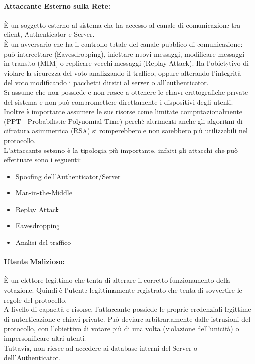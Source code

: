 		\paragraph{Attaccante Esterno sulla Rete:}
		È un soggetto esterno al sistema che ha accesso al canale di comunicazione tra client, Authenticator e Server.\\
		È un avversario che ha il controllo totale del canale pubblico di comunicazione: può intercettare (Eavesdropping), iniettare nuovi messaggi, modificare messaggi in transito (MIM) o replicare vecchi messaggi (Replay Attack). Ha l'obietytivo di violare la sicurezza del voto analizzando il traffico, oppure alterando l'integrità del voto modificando i pacchetti diretti al server o all'authenticator.\\
		Si assume che non possiede e non riesce a ottenere le chiavi crittografiche private del sistema e non può compromettere direttamente i dispositivi degli utenti. Inoltre è importante assumere le sue risorse come limitate computazionalmente (PPT - Probabilistic Polynomial Time) perchè altrimenti anche gli algoritmi di cifratura asimmetrica (RSA) si romperebbero e non sarebbero più utilizzabili nel protocollo.\\
		L'attaccante esterno è la tipologia più importante, infatti gli attacchi che può effettuare sono i seguenti:
		\begin{itemize}
			\item Spoofing dell'Authenticator/Server
			\item Man-in-the-Middle
			\item Replay Attack
			\item Eavesdropping
			\item Analisi del traffico
		\end{itemize}
		
		\paragraph{Utente Malizioso:}
		È un elettore legittimo che tenta di alterare il corretto funzionamento della votazione. Quindi è l'utente legittimamente registrato che tenta di sovvertire le regole del protocollo.\\
		A livello di capacità e risorse, l'attaccante possiede le proprie credenziali legittime di autenticazione e chiavi private. Può deviare arbitrariamente dalle istruzioni del protocollo, con l'obiettivo di votare più di una volta (violazione dell'unicità) o impersonificare altri utenti.\\
		Tuttavia, non riesce ad accedere ai database interni del Server o dell'Authenticator.
		
